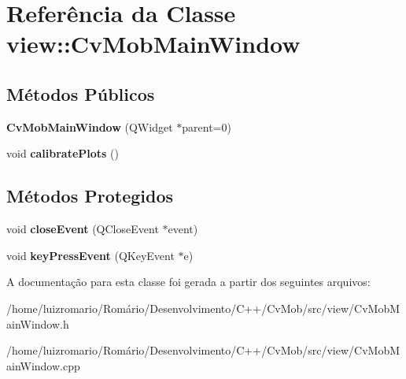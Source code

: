 \hypertarget{classview_1_1CvMobMainWindow}{
\section{Referência da Classe view::CvMobMainWindow}
\label{classview_1_1CvMobMainWindow}
}
\subsection*{Métodos Públicos}
\begin{DoxyCompactItemize}
\item 
\hypertarget{classview_1_1CvMobMainWindow_ac1c7dd07b0f2fd209b0601f67573636f}{
{\bfseries CvMobMainWindow} (QWidget $\ast$parent=0)}
\label{classview_1_1CvMobMainWindow_ac1c7dd07b0f2fd209b0601f67573636f}

\item 
\hypertarget{classview_1_1CvMobMainWindow_a1d6fd9ebb65b31b6eca0cff126b9eb50}{
void {\bfseries calibratePlots} ()}
\label{classview_1_1CvMobMainWindow_a1d6fd9ebb65b31b6eca0cff126b9eb50}

\end{DoxyCompactItemize}
\subsection*{Métodos Protegidos}
\begin{DoxyCompactItemize}
\item 
\hypertarget{classview_1_1CvMobMainWindow_a58967d72e38ad5355729132bbf18baae}{
void {\bfseries closeEvent} (QCloseEvent $\ast$event)}
\label{classview_1_1CvMobMainWindow_a58967d72e38ad5355729132bbf18baae}

\item 
\hypertarget{classview_1_1CvMobMainWindow_a68ceb75fc638a19a10cf203acd30ca97}{
void {\bfseries keyPressEvent} (QKeyEvent $\ast$e)}
\label{classview_1_1CvMobMainWindow_a68ceb75fc638a19a10cf203acd30ca97}

\end{DoxyCompactItemize}


A documentação para esta classe foi gerada a partir dos seguintes arquivos:\begin{DoxyCompactItemize}
\item 
/home/luizromario/Romário/Desenvolvimento/C++/CvMob/src/view/CvMobMainWindow.h\item 
/home/luizromario/Romário/Desenvolvimento/C++/CvMob/src/view/CvMobMainWindow.cpp\end{DoxyCompactItemize}
